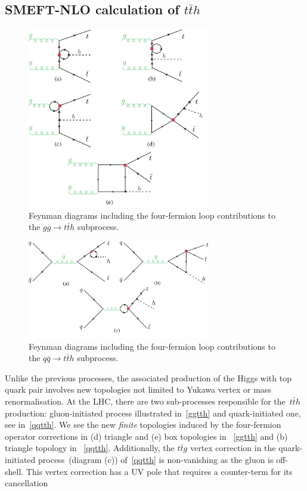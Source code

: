 \subsection{SMEFT-NLO calculation of  $t\bar th$}
\begin{figure}[h!]
	\centering
	\includegraphics[width=8cm]{./fig/ggttH-4F_NLO}
	\caption{Feynman diagrams including the four-fermion loop contributions to the $ gg \to t\bar{t} h$ subprocess.}
	\label{ggtth}
\end{figure}
\begin{figure}[hth]
	\centering
	\includegraphics[width=8cm]{./fig/qqttH-4F_NLO}
	\caption{Feynman diagrams including the four-fermion loop contributions to the  $ q \bar{q} \to t\bar{t} h$ subprocess.}
	\label{qqtth}
\end{figure}
\par Unlike the previous processes, the associated production of the Higgs with top quark pair involves new topologies not limited to Yukawa vertex or mass renormalisation.  At the LHC, there are two sub-processes responsible for the~$t\bar t h$ production: gluon-initiated process illustrated in~\autoref{ggtth} and quark-initiated one, see in~\autoref{qqtth}. We see the new \emph{finite} topologies induced by the four-fermion operator corrections in (d) triangle and (e) box topologies in ~\autoref{ggtth} and (b) triangle topology in ~\autoref{qqtth}.  Additionally, the $t\bar t g$ vertex correction in the quark-initiated process~(diagram (c)) of~\autoref{qqtth} is non-vanishing as the gluon is off-shell. This vertex correction has a UV pole that requires a counter-term for its cancellation
